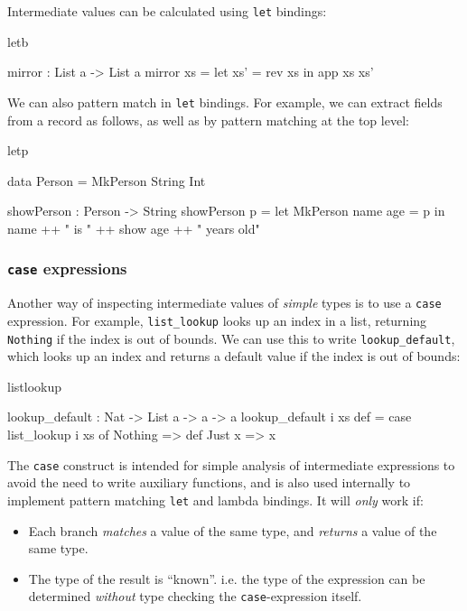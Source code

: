 Intermediate values can be calculated using \texttt{let} bindings:

\begin{SaveVerbatim}{letb}

mirror : List a -> List a
mirror xs = let xs' = rev xs in
                app xs xs'

\end{SaveVerbatim}

\noindent
We can also pattern match in \texttt{let} bindings. For example, we can extract
fields from a record as follows, as well as by pattern matching at the top level:

\begin{SaveVerbatim}{letp}

data Person = MkPerson String Int

showPerson : Person -> String
showPerson p = let MkPerson name age = p in
                   name ++ " is " ++ show age ++ " years old"

\end{SaveVerbatim}
\subsubsection{\texttt{case} expressions}

Another way of inspecting intermediate values of \emph{simple} types
is to use a \texttt{case} expression.
For example, \texttt{list\_lookup}
looks up an index in a list, returning \texttt{Nothing} if the index is out
of bounds. We can use this to write \texttt{lookup\_default}, which
looks up an index and returns a default value if the index is out of bounds:

\begin{SaveVerbatim}{listlookup}

lookup_default : Nat -> List a -> a -> a
lookup_default i xs def = case list_lookup i xs of
                              Nothing => def
                              Just x => x

\end{SaveVerbatim}

The \texttt{case} construct is intended for simple analysis
of intermediate expressions to avoid the need to write auxiliary functions, and is
also used internally to implement pattern matching \texttt{let} and lambda bindings. 
It will \emph{only} work if:

\begin{itemize}
\item Each branch \emph{matches} a value of the same type, and \emph{returns} a
value of the same type.
\item The type of the result is ``known''. i.e. the type of the expression can be
determined \emph{without} type checking the \texttt{case}-expression itself. 
\end{itemize}

